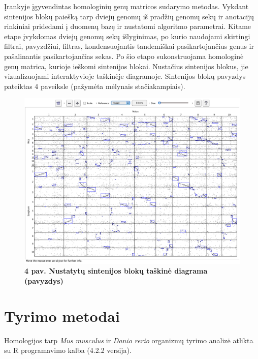 \documentclass[12pt]{article}
\begin{document}
Įrankyje įgyvendintas homologinių genų matricos sudarymo metodas. Vykdant
sintenijos blokų paiešką tarp dviejų genomų iš pradžių genomų sekų ir anotacijų
rinkiniai pridedami į duomenų bazę ir nustatomi algoritmo parametrai. Kitame
etape įvykdomas dviejų genomų sekų išlyginimas, po kurio naudojami skirtingi
filtrai, pavyzdžiui, filtras, kondensuojantis tandemiškai pasikartojančius
genus ir pašalinantis pasikartojančias sekas. Po šio etapo sukonstruojama
homologinė genų matrica, kurioje ieškomi sintenijos blokai. Nustačius sintenijos
blokus, jie vizualizuojami interaktyvioje taškinėje diagramoje. Sintenijos blokų
pavyzdys pateiktas 4 paveiksle (pažymėta mėlynais stačiakampiais).

\begin{figure}[htb]
    \begin{center}
        \includegraphics[width=0.8\linewidth]{../Figures/Synteny_dotplot_example.png}
        \vspace{-0.5\baselineskip}
        \caption*{\small\textbf{4 pav. Nustatytų sintenijos blokų taškinė
                                diagrama (pavyzdys)}}
        \label{fig:4}
    \end{center}
\end{figure}

\newpage


\section{Tyrimo metodai}
Homologijos tarp \emph{Mus musculus} ir \emph{Danio rerio} organizmų tyrimo
analizė atlikta su R programavimo kalba\cite{R} (4.2.2 versija).
\end{document}
